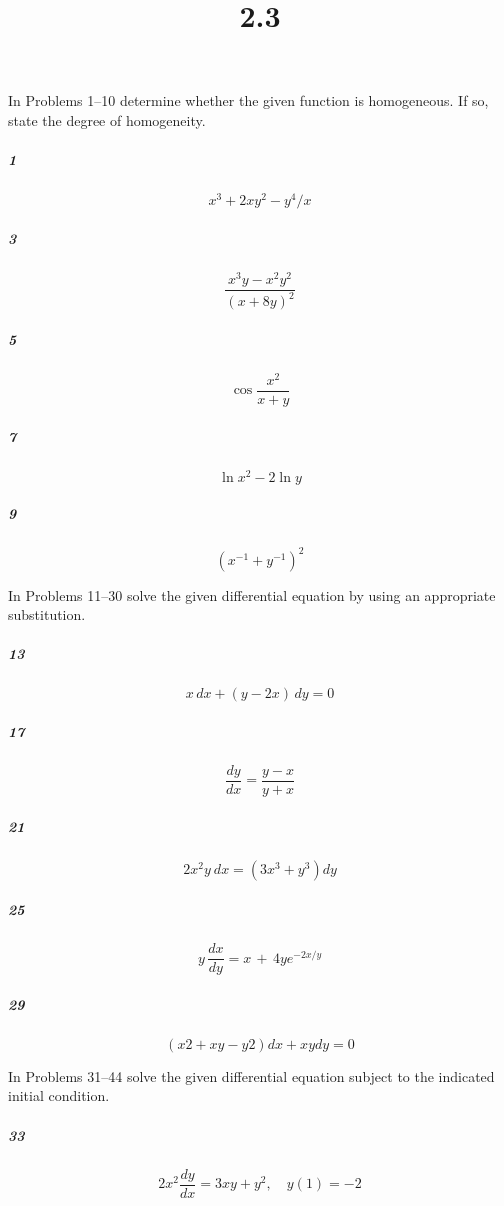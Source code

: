 \documentclass[fleqn]{article}
\title{2.3}
\begin{document}
\maketitle
\pagebreak
In Problems 1–10 determine whether the given function is homogeneous. If so, state the degree of homogeneity.

\subparagraph{1}

\[
x^3 + 2xy^2 - y^4/x
\]
\vfill


\pagebreak


\subparagraph{3}

\[
\frac{x^3y - x^2y^2}{(x+8y)^2}
\]
\vfill


\pagebreak


\subparagraph{5}

\[
\cos\frac{x^2}{x+y}
\]
\vfill


\pagebreak


\subparagraph{7}

\[
\ln x^2 - 2 \ln y
\]
\vfill


\pagebreak


\subparagraph{9}

\[
(x^{-1} + y^{-1})^2
\]
\vfill


\pagebreak
In Problems 11–30 solve the given differential equation by using an appropriate substitution.

\subparagraph{13}

\[
x\,dx + (y-2x)\,dy = 0
\]
\vfill


\pagebreak


\subparagraph{17}

\[
\frac{dy}{dx} = \frac{y - x}{y + x}
\]
\vfill


\pagebreak


\subparagraph{21}

\[
2x^2y\ dx = (3x^3 + y^3)dy
\]
\vfill


\pagebreak


\subparagraph{25}

\[
y\,\frac{dx}{dy} = x\,+\,4ye^{-2x/y}
\]
\vfill


\pagebreak


\subparagraph{29}

\[
(x2 + xy - y2)dx + xy dy = 0
\]
\vfill


\pagebreak
In Problems 31–44 solve the given differential equation subject to the indicated initial condition.

\subparagraph{33}

\[
2x^2 \frac{dy}{dx} = 3xy + y^2, \quad y(1) = -2
\]
\vfill
\end{document}
